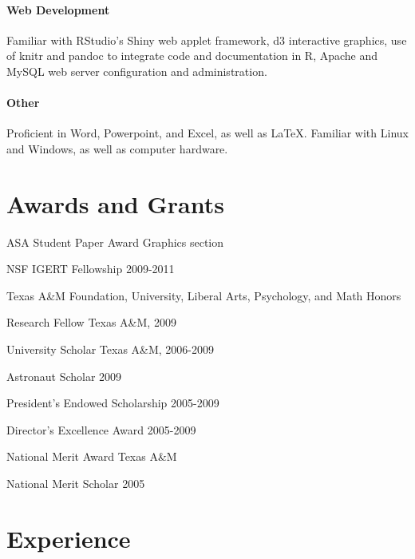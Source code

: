 \documentclass[10pt]{tccv}
\begin{document}
\paragraph{\textbf{Web Development}}
Familiar with RStudio's Shiny web applet framework, d3 interactive graphics, use of knitr and pandoc to integrate code and documentation in R, Apache and MySQL web server configuration and administration.\vspace{-6pt}
\paragraph{\textbf{Other}}
Proficient in Word, Powerpoint, and Excel, as well as LaTeX. Familiar with Linux and Windows, as well as computer hardware. 

\section{Awards and Grants}
\begin{factlist}[leftmargin=.1cm,itemindent=.1cm,labelwidth=\itemindent,labelsep=.1cm]\itemsep-2pt
\item[ASA Student Paper Award] Graphics section
\item[NSF IGERT Fellowship] 2009-2011
\item[Texas A\&M] Foundation, University, Liberal Arts, Psychology, and Math Honors
\item[Research Fellow] Texas A\&M, 2009
\item[University Scholar] Texas A\&M, 2006-2009
\item[Astronaut Scholar] 2009
\item[President's Endowed Scholarship] 2005-2009
\item[Director's Excellence Award] 2005-2009
\item[National Merit Award] Texas A\&M
\item[National Merit Scholar] 2005
\end{factlist}

\section{Experience}
\end{document}
